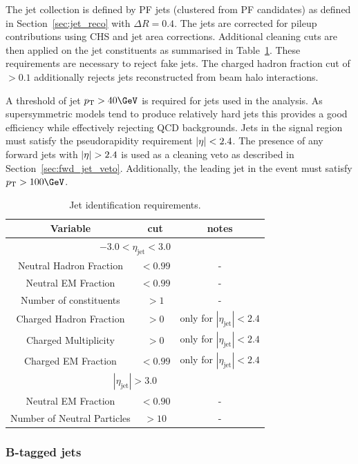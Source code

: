 The jet collection is defined by PF jets (clustered from PF candidates) as defined in Section~\ref{sec:jet_reco} with
$\Delta R = 0.4$. The jets are corrected for pileup contributions using CHS and jet area corrections. Additional cleaning cuts are then applied
on the jet constituents as summarised in Table~\ref{tab:loose-jet-id}. These requirements are necessary to reject fake jets. The charged hadron
fraction cut of $> 0.1$ additionally rejects jets reconstructed from beam halo interactions.

A threshold of jet $\pt > 40 \GeV$ is required for jets used in the analysis. As supersymmetric models tend to produce
relatively hard jets this provides a good efficiency while effectively rejecting QCD backgrounds. Jets in the signal 
region must satisfy the pseudorapidity requirement $|\eta| < 2.4$. The presence of any forward jets with $|\eta| > 2.4$
is used as a cleaning veto as described in Section~\ref{sec:fwd_jet_veto}. Additionally, the leading jet in the 
event must satisfy $\pt > 100\GeV$. 
\begin{table}[ht!]
  \caption{Jet identification requirements. \label{tab:loose-jet-id}}
  \centering
  \begin{tabular}{ ccc }
    \hline
    \hline
    Variable & cut & notes \\ \hline
    \multicolumn{3}{c}{$-3.0 < \eta_{\mathrm{jet}} < 3.0$} \\ \hline    
    Neutral Hadron Fraction & $<0.99$ & - \\
    Neutral EM Fraction & $<0.99$ & - \\
    Number of constituents & $>1$ & - \\
    Charged Hadron Fraction & $>0$ & only for $|\eta_{\mathrm{jet}}| < 2.4$ \\
    Charged Multiplicity & $>0$ & only for $|\eta_{\mathrm{jet}}| < 2.4$ \\
    Charged EM Fraction & $<0.99$ & only for $|\eta_{\mathrm{jet}}| < 2.4$ \\ \hline
    \multicolumn{3}{c}{$|\eta_{\mathrm{jet}}| > 3.0$} \\ \hline        
    Neutral EM Fraction & $<0.90$ & - \\
    Number of Neutral Particles & $>10$ & - \\
    \hline
    \hline
  \end{tabular}
\end{table}

\subsubsection{B-tagged jets}

